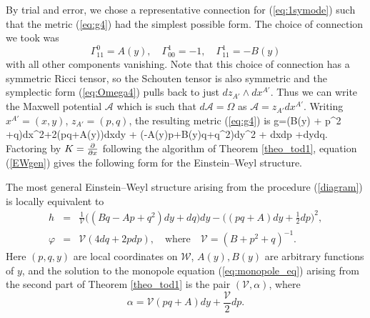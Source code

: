 By trial and error, we chose a representative connection for (\ref{eq:1symode}) such that the metric (\ref{eq:g4}) had the simplest possible form. The choice of connection we took was
\[
\Gamma^{0}_{11}=A(y),\quad \Gamma^{1}_{00}=-1, \quad \Gamma^{1}_{11}=-B(y)
\]
with all other components vanishing. Note that this choice of connection has a symmetric Ricci tensor, so the Schouten tensor is also symmetric and the symplectic form (\ref{eq:Omega4}) pulls back to just $dz_{A'}\wedge dx^{A'}$. Thus we can write the Maxwell potential $\mathcal{A}$ which is such that $d\mathcal{A}=\Omega$ as $\mathcal{A}=z_{A'}dx^{A'}$. Writing $x^{A'}=(x,y)$, $z_{A'}=(p,q)$, the resulting metric (\ref{eq:g4}) is
\be
\label{einstein_1}
g=(B(y) + p^2 +q)dx^2+2(pq+A(y))dxdy + (-A(y)p+B(y)q+q^2)dy^2 + dxdp +dydq.
\ee
Factoring by $K=\frac{\partial}{\partial x}$ following the algorithm of Theorem
\ref{theo_tod1}, equation (\ref{EWgen}) gives the following form for the Einstein--Weyl structure.
\begin{prop}
\label{prop1}
The most general  Einstein--Weyl structure arising
from the procedure (\ref{diagram}) is locally equivalent to
\begin{eqnarray}
\label{ew_final}
h&=&\frac{1}{\mathscr{V}}\big((Bq -Ap+ q^2)dy+dq\big)dy
-\Big((pq+A)dy+\frac{1}{2}dp\Big)^2, \label{genh} \\
\varphi&=&\mathscr{V}(4dq+2 pdp), \quad\mbox{where}\quad \mathscr{V}=
({B}+ p^2+q)^{-1}.\nonumber
\end{eqnarray}
Here $(p, q, y)$ are local coordinates on $\mathcal{W}$, $A(y), B(y)$ are arbitrary functions of $y$, and the solution to the monopole equation (\ref{eq:monopole_eq}) arising from the second part of Theorem \ref{theo_tod1} is the pair $(\mathscr{V},\alpha)$, where
\[
\alpha=\mathscr{V}( pq+A)dy+\frac{\mathscr{V}}{2}dp.
\]
\end{prop}


